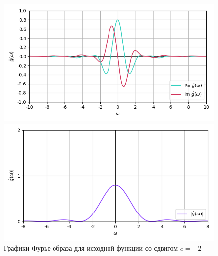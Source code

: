\documentclass[a4paper]{article}
\begin{document}
\begin{figure}[H]
    \begin{minipage}{0.5\textwidth}
        \centering \includegraphics[width=\textwidth]{sources/6_complex/fourier_2.png}
    \end{minipage}\hfill
    \begin{minipage}{0.5\textwidth}
        \centering \includegraphics[width=\textwidth]{sources/6_complex/abs_2.png}
    \end{minipage}
    \caption{Графики Фурье-образа для исходной функции со сдвигом $c = -2$} 
\end{figure}
\end{document}
